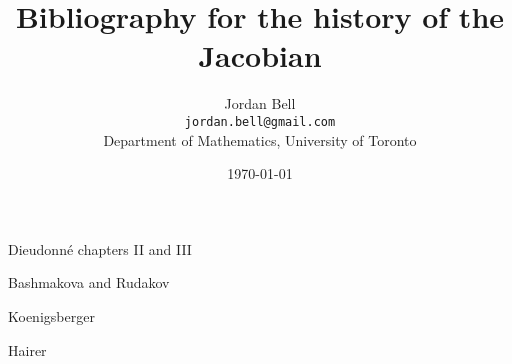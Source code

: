 \documentclass{article}
\begin{document}
\title{Bibliography for the history of the Jacobian}
\author{Jordan Bell\\ \texttt{jordan.bell@gmail.com}\\Department of Mathematics, University of Toronto}
\date{\today}
\maketitle


Dieudonn\'e chapters II and III \cite{abregeI}

Bashmakova and Rudakov \cite[p.~82]{bashmakova}

Koenigsberger \cite[pp.~173, 270, 342, 344, 401]{koenigsberger}

Hairer \cite[p.~66]{hairer}


\nocite{*}



\end{document}
